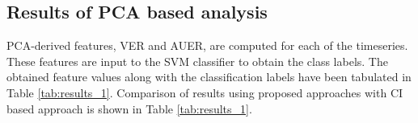 \documentclass[journal]{IEEEtran}
\begin{document}
	
	

	
	\subsection{Results of PCA based analysis}
	
	
	
	
	PCA-derived features, VER and AUER, are computed for each of the timeseries. These features are input to the SVM classifier to obtain the class labels. The obtained feature values along with  the classification labels have been tabulated in Table \ref{tab:results_1}.
	Comparison of results using proposed approaches with CI based approach \cite{Adegoke2018} is shown in Table \ref{tab:results_1}.
\end{document}

